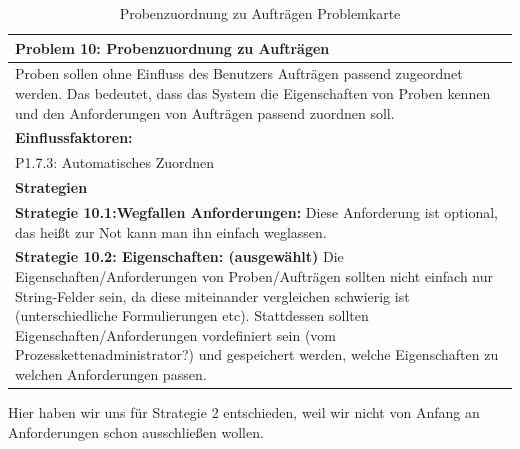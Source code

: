 \documentclass[enabledeprecatedfontcommands,fontsize=12pt,paper=a4,twoside]{scrartcl}
\begin{document}
\begin{table}[H]
    \centering
    \begin{tabular}{|p{15cm}|}
    \hline
          \textbf{Problem 10:} Probenzuordnung zu Aufträgen
          \\ \hline
          Proben sollen ohne Einfluss des Benutzers Aufträgen passend zugeordnet werden. Das bedeutet, dass das System die Eigenschaften von Proben kennen und den Anforderungen von Aufträgen passend zuordnen soll.
          \\ \hline
          \textbf{Einflussfaktoren: } \\
          P1.7.3: Automatisches Zuordnen \\
          \hline
          \textbf{Strategien} \\ \hline
  {}          
           \label{strategie:10.1}     
          \textbf{Strategie 10.1:Wegfallen Anforderungen:} Diese Anforderung ist optional, das heißt zur Not kann man ihn einfach weglassen. \\
  {}          
           \label{strategie:10.2}     
	  \textbf{Strategie 10.2: Eigenschaften: (ausgewählt)} Die Eigenschaften/Anforderungen von Proben/Aufträgen sollten nicht einfach nur String-Felder sein, da diese miteinander vergleichen schwierig ist (unterschiedliche Formulierungen etc). Stattdessen sollten Eigenschaften/Anforderungen vordefiniert sein (vom Prozesskettenadministrator?) und gespeichert werden, welche Eigenschaften zu welchen Anforderungen passen.\\ \hline
    \end{tabular}
    \caption{Probenzuordnung zu Aufträgen Problemkarte}
    \label{tab:ProblemKarte10}
\end{table}
Hier haben wir uns für Strategie 2 entschieden, weil wir nicht von Anfang an Anforderungen schon ausschließen wollen. \\
\end{document}
